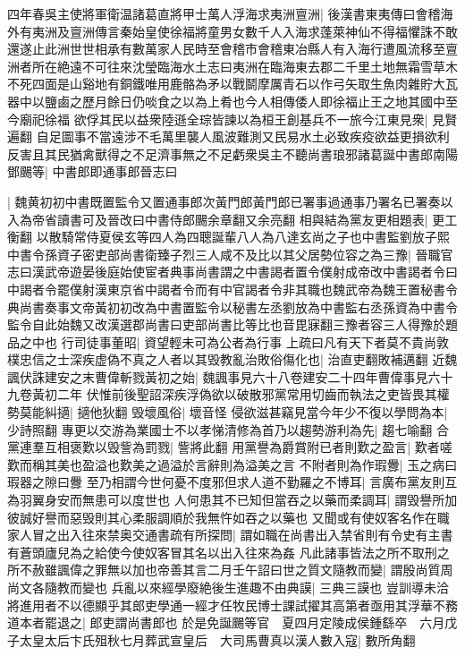 四年春吳主使將軍衛温諸葛直將甲士萬人浮海求夷洲亶洲|{
	後漢書東夷傳曰會稽海外有夷洲及亶洲傳言秦始皇使徐福將童男女數千人入海求蓬萊神仙不得福懼誅不敢還遂止此洲世世相承有數萬家人民時至會稽市會稽東冶縣人有入海行遭風流移至亶洲者所在絶遠不可往來沈瑩臨海水土志曰夷洲在臨海東去郡二千里土地無霜雪草木不死四面是山谿地有銅鐵唯用鹿骼為矛以戰鬬摩厲青石以作弓矢取生魚肉雜貯大瓦器中以鹽鹵之歷月餘日仍啖食之以為上肴也今人相傳倭人即徐福止王之地其國中至今廟祀徐福}
欲俘其民以益衆陸遜全琮皆諫以為桓王創基兵不一旅今江東見衆|{
	見賢遍翻}
自足圖事不當遠涉不毛萬里襲人風波難測又民易水土必致疾疫欲益更損欲利反害且其民猶禽獸得之不足濟事無之不足虧衆吳主不聽尚書琅邪諸葛誕中書郎南陽鄧颺等|{
	中書郎即通事郎晉志曰}


|{
	魏黄初初中書既置監令又置通事郎次黃門郎黃門郎已署事過通事乃署名已署奏以入為帝省讀書可及晉改曰中書侍郎颺余章翻又余亮翻}
相與結為黨友更相題表|{
	更工衡翻}
以散騎常侍夏侯玄等四人為四聰誕輩八人為八達玄尚之子也中書監劉放子熙中書令孫資子密吏部尚書衛臻子烈三人咸不及比以其父居勢位容之為三豫|{
	晉職官志曰漢武帝遊晏後庭始使宦者典事尚書謂之中書謁者置令僕射成帝改中書謁者令曰中謁者令罷僕射漢東京省中謁者令而有中官謁者令非其職也魏武帝為魏王置秘書令典尚書奏事文帝黃初初改為中書置監令以秘書左丞劉放為中書監右丞孫資為中書令監令自此始魏又改漢選郡尚書曰吏部尚書比等比也音毘寐翻三豫者容三人得豫於題品之中也}
行司徒事董昭|{
	資望輕未可為公者為行事}
上疏曰凡有天下者莫不貴尚敦樸忠信之士深疾虚偽不真之人者以其毁教亂治敗俗傷化也|{
	治直吏翻敗補邁翻}
近魏諷伏誅建安之末曹偉斬戮黃初之始|{
	魏諷事見六十八卷建安二十四年曹偉事見六十九卷黃初二年}
伏惟前後聖詔深疾浮偽欲以破散邪黨常用切齒而執法之吏皆畏其權勢莫能糾擿|{
	擿他狄翻}
毁壞風俗|{
	壞音怪}
侵欲滋甚竊見當今年少不復以學問為本|{
	少詩照翻}
專更以交游為業國士不以孝悌清修為首乃以趨勢游利為先|{
	趨七喻翻}
合黨連羣互相褒歎以毁訾為罰戮|{
	訾將此翻}
用黨譽為爵賞附已者則歎之盈言|{
	歎者嗟歎而稱其美也盈溢也歎美之過溢於言辭則為溢美之言}
不附者則為作瑕釁|{
	玉之病曰瑕器之隙曰釁}
至乃相謂今世何憂不度邪但求人道不勤羅之不博耳|{
	言廣布黨友則互為羽翼身安而無患可以度世也}
人何患其不已知但當吞之以藥而柔調耳|{
	謂毁譽所加彼誠好譽而惡毁則其心柔服調順於我無忤如吞之以藥也}
又聞或有使奴客名作在職家人冒之出入往來禁奥交通書疏有所探問|{
	謂如職在尚書出入禁省則有令史有主書有蒼頭廬兒為之給使今使奴客冒其名以出入往來為姦}
凡此諸事皆法之所不取刑之所不赦雖諷偉之罪無以加也帝善其言二月壬午詔曰世之質文隨教而變|{
	謂殷尚質周尚文各隨教而變也}
兵亂以來經學廢絶後生進趣不由典謨|{
	三典三謨也}
豈訓導未洽將進用者不以德顯乎其郎吏學通一經才任牧民博士課試擢其高第者亟用其浮華不務道本者罷退之|{
	郎吏謂尚書郎也}
於是免誕颺等官　夏四月定陵成侯鍾繇卒　六月戊子太皇太后卞氏殂秋七月葬武宣皇后　大司馬曹真以漢人數入寇|{
	數所角翻}
